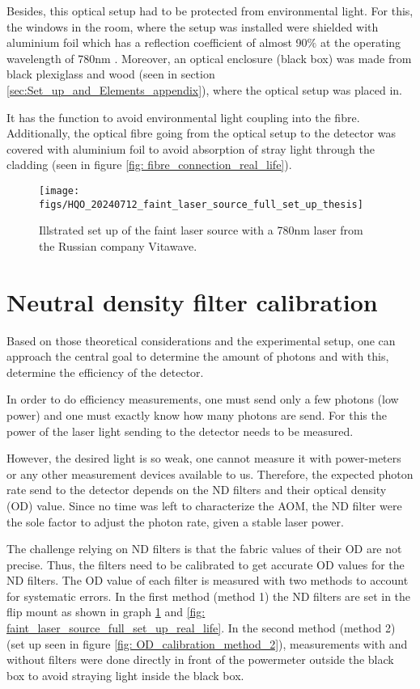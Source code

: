 Besides, this optical setup had to be protected from environmental light.
For this, the windows in the room, where the setup was installed were shielded
with aluminium foil which has a reflection coefficient of almost 90$\%$ at the operating wavelength of 780nm \cite{Alu_reflectionsgrad}.
Moreover, an optical enclosure (black box) was  made from black plexiglass and wood (seen in section \ref{sec:Set_up_and_Elements_appendix}),
where the optical setup was placed in.

It has the function to avoid environmental light coupling into the fibre.
Additionally, the optical fibre going from the optical setup to the detector was covered with aluminium foil to avoid
absorption of stray light through the cladding (seen in figure \ref{fig: fibre_connection_real_life}).\\

\begin{figure}
    \centering
    \texttt{[image: figs/HQO\_20240712\_faint\_laser\_source\_full\_set\_up\_thesis]}
    \caption{Illstrated set up of the faint laser source with a 780nm laser from the Russian company Vitawave.}
    \label{fig: faint_laser_source_full_set_up}
\end{figure}

\section{Neutral density filter calibration}\label{sec:ND_filter_calibration}

Based on those theoretical considerations and the experimental setup, one can approach the central goal to determine the
amount of photons and with this, determine the efficiency of the detector.

In order to do efficiency measurements, one must send only a few photons (low power) and one must
exactly know how many photons are send.
For this the power of the laser light sending to the detector needs to be measured.

However, the desired light is so weak, one cannot measure it with power-meters or any other measurement devices available to us.
Therefore, the expected photon rate send to the detector depends on the ND filters and their optical density (OD) value.
Since no time was left to characterize the AOM, the ND filter were the sole factor to adjust the photon rate, given a stable laser power.

The challenge relying on ND filters is that the fabric values of their OD are not precise.
Thus, the filters need to be calibrated to get accurate OD values for the ND filters.
The OD value of each filter is measured with two methods to account for systematic errors.
In the first method (method 1) the ND filters are set in the flip mount as shown in graph \ref{fig: faint_laser_source_full_set_up} and
\ref{fig: faint_laser_source_full_set_up_real_life}.
In the second method (method 2) (set up seen in figure \ref{fig: OD_calibration_method_2}), measurements with and without filters were done directly in front of the powermeter
outside the black box to avoid straying light inside the black box.

